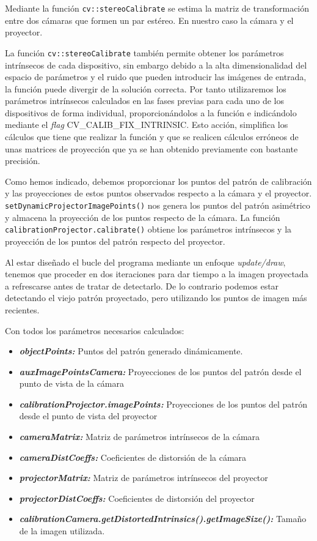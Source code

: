 Mediante la función \texttt{cv::stereoCalibrate} se estima la matriz de transformación entre dos cámaras que formen un par estéreo. En nuestro caso la cámara y el proyector. 

La función \texttt{cv::stereoCalibrate} también permite obtener los parámetros intrínsecos de cada dispositivo, sin embargo debido a la alta dimensionalidad del espacio de parámetros y el ruido que pueden introducir las imágenes de entrada, la función puede divergir de la solución correcta. Por tanto utilizaremos los parámetros intrínsecos calculados en las fases previas para cada uno de los dispositivos de forma individual, proporcionándolos a la función e indicándolo mediante el \emph{flag} CV\_CALIB\_FIX\_INTRINSIC. Esto acción, simplifica los cálculos que tiene que realizar la función y que se realicen cálculos erróneos de unas matrices de proyección que ya se han obtenido previamente con bastante precisión. 

Como hemos indicado, debemos proporcionar los puntos del patrón de calibración y las proyecciones de estos puntos observados respecto a la cámara y el proyector. \texttt{setDynamicProjectorImagePoints()} nos genera los puntos del patrón asimétrico y almacena la proyección de los puntos respecto de la cámara. La función \texttt{calibrationProjector.calibrate()} obtiene los parámetros intrínsecos y la proyección de los puntos del patrón respecto del proyector. 

Al estar diseñado el bucle del programa mediante un enfoque \emph{update/draw}, tenemos que proceder en dos iteraciones para dar tiempo a la imagen proyectada a refrescarse antes de tratar de detectarlo. De lo contrario podemos estar detectando el viejo patrón proyectado, pero utilizando los puntos de imagen más recientes.

Con todos los parámetros necesarios calculados:
\begin{itemize}
  \item \textbf{\textit{objectPoints:}} Puntos del patrón generado dinámicamente.
  \item \textbf{\textit{auxImagePointsCamera:}} Proyecciones de los puntos del patrón desde el punto de vista de la cámara
  \item \textbf{\textit{calibrationProjector.imagePoints:}} Proyecciones de los puntos del patrón desde el punto de vista del proyector
  \item \textbf{\textit{cameraMatrix:}} Matriz de parámetros intrínsecos de la cámara
  \item \textbf{\textit{cameraDistCoeffs:}} Coeficientes de distorsión de la cámara
  \item \textbf{\textit{projectorMatrix:}} Matriz de parámetros intrínsecos del proyector
  \item \textbf{\textit{projectorDistCoeffs:}} Coeficientes de distorsión del proyector
  \item \textbf{\textit{calibrationCamera.getDistortedIntrinsics().getImageSize():}} Tamaño de la imagen utilizada.
\end{itemize}  
 

